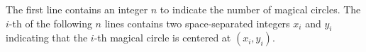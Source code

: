The first line contains an integer $n$ to indicate the number of 
magical circles.
The $i$-th of the following $n$ lines contains two space-separated integers 
$x_i$ and $y_i$
indicating that the $i$-th magical circle is centered at $(x_i,y_i)$.
